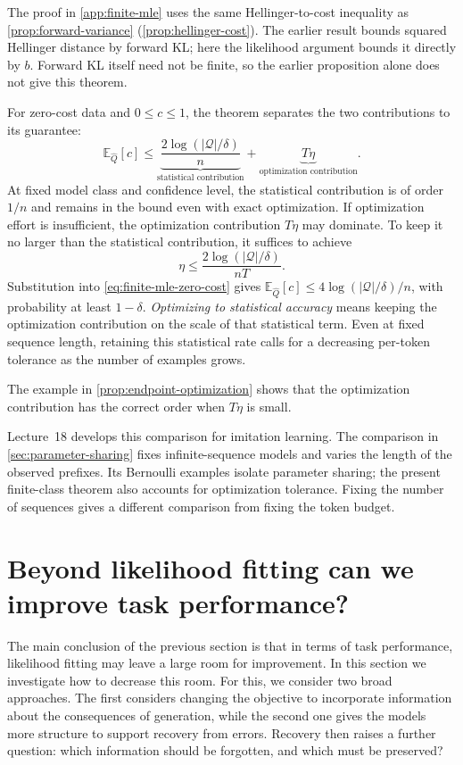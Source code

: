 \documentclass[11pt,twoside]{article}
\newcommand{\E}{\mathbb E}
\theoremstyle{definition}
\theoremstyle{remark}
\begin{document}
The proof in \cref{app:finite-mle} uses the same Hellinger-to-cost
inequality as \cref{prop:forward-variance}
(\cref{prop:hellinger-cost}). The earlier result bounds squared
Hellinger distance by forward KL; here the likelihood argument bounds
it directly by \(b\). Forward KL itself need not be finite, so the
earlier proposition alone does not give this theorem.

For zero-cost data and \(0\le c\le1\), the theorem separates the two
contributions to its guarantee:
\begin{equation}
 \E_{\widehat Q}[c]\le
 \underbrace{\frac{2\log(|\mathcal Q|/\delta)}n}_{\text{statistical contribution}}
 +\underbrace{T\eta}_{\text{optimization contribution}}.
 \label{eq:finite-mle-zero-cost}
\end{equation}
At fixed model class and confidence level, the statistical contribution
is of order \(1/n\) and remains in the bound even with exact optimization.
If optimization effort is insufficient, the optimization contribution
\(T\eta\) may dominate. To keep it no larger than the statistical
contribution, it suffices to achieve
\begin{equation}
 \eta\le\frac{2\log(|\mathcal Q|/\delta)}{nT}.
 \label{eq:statistical-accuracy}
\end{equation}
Substitution into \cref{eq:finite-mle-zero-cost} gives
\(\E_{\widehat Q}[c]\le4\log(|\mathcal Q|/\delta)/n\), with probability
at least \(1-\delta\).
\emph{Optimizing to statistical accuracy} means keeping
the optimization contribution on the scale of that statistical term.
Even at fixed sequence length, retaining this statistical rate calls
for a decreasing per-token tolerance as the number of examples grows.

The example in \cref{prop:endpoint-optimization} shows that the
optimization contribution has the correct order when \(T\eta\) is small.

Lecture~18 develops this comparison for imitation learning.
The comparison in \cref{sec:parameter-sharing} fixes infinite-sequence
models and varies the length of the observed prefixes. Its Bernoulli
examples isolate parameter sharing; the present finite-class theorem
also accounts for optimization tolerance. Fixing the number of sequences
gives a different comparison from fixing the token budget.

\section{Beyond likelihood fitting can we improve task performance?}
\label{sec:better-control}
The main conclusion of the previous section is that
in terms of task performance, likelihood fitting
may leave a large room for improvement.
In this section we investigate how to decrease this room.
For this, we consider two broad approaches.
The first considers changing the objective to incorporate information
about the consequences of generation,
while the second one gives the models
more structure to support
recovery from errors. Recovery then raises a further question: which
information should be forgotten, and which must be preserved?
\end{document}
